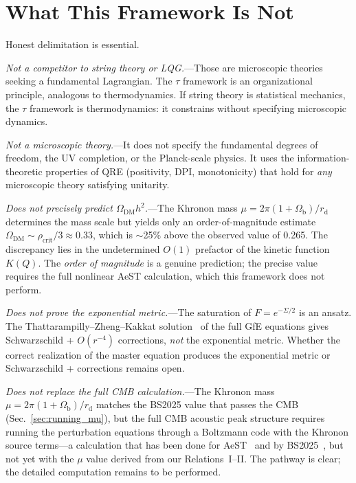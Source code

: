 \documentclass[prd,twocolumn,superscriptaddress,longbibliography,floatfix]{revtex4-2}
\newcommand{\tauasym}{\tau}
\newcommand{\OmDM}{\Omega_{\mathrm{DM}}}
\begin{document}
\section{What This Framework Is Not}
\label{sec:not}

Honest delimitation is essential.

\emph{Not a competitor to string theory or LQG.}---Those
are microscopic theories seeking a fundamental Lagrangian.
The $\tauasym$ framework is an organizational principle,
analogous to thermodynamics.  If string theory is
statistical mechanics, the $\tauasym$ framework is
thermodynamics: it constrains without specifying
microscopic dynamics.

\emph{Not a microscopic theory.}---It does not specify
the fundamental degrees of freedom, the UV completion,
or the Planck-scale physics.  It uses the information-theoretic
properties of QRE (positivity, DPI, monotonicity) that
hold for \emph{any} microscopic theory satisfying
unitarity.

\emph{Does not precisely predict $\OmDM h^2$.}---The
Khronon mass
$\mu = 2\pi(1+\Omega_{\mathrm{b}})/r_{\mathrm{d}}$
determines the mass scale but yields only an
order-of-magnitude estimate
$\OmDM \sim \rho_{\mathrm{crit}}/3 \approx 0.33$,
which is $\sim$25\% above the observed value of 0.265.
The discrepancy lies in the undetermined $O(1)$
prefactor of the kinetic function $K(Q)$.  The
\emph{order of magnitude} is a genuine prediction;
the precise value requires the full nonlinear AeST
calculation, which this framework does not perform.

\emph{Does not prove the exponential metric.}---The
saturation of $F = e^{-\Sigma/2}$ is an ansatz.
The Thattarampilly--Zheng--Kakkat
solution~\cite{Thattarampilly2026} of the full GfE
equations gives Schwarzschild + $O(r^{-4})$ corrections,
\emph{not} the exponential metric.  Whether the
correct realization of the master equation produces the
exponential metric or Schwarzschild + corrections
remains open.

\emph{Does not replace the full CMB calculation.}---The
Khronon mass
$\mu = 2\pi(1+\Omega_{\mathrm{b}})/r_{\mathrm{d}}$
matches the BS2025 value that passes the CMB
(Sec.~\ref{sec:running_mu}), but the full CMB acoustic
peak structure requires running the perturbation
equations through a Boltzmann code with the Khronon
source terms---a calculation that has been done for
AeST~\cite{SkordisZlosnik2021} and by
BS2025~\cite{BS2025}, but not yet with the $\mu$
value derived from our Relations~I--II.  The pathway
is clear; the detailed computation remains to be
performed.
\end{document}
